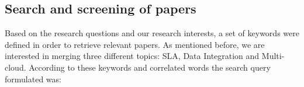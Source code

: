 \subsection{Search and screening of papers} \label{subsec:search}

Based on the research questions and our research interests, a set of keywords were defined in order to 
retrieve relevant papers.
As mentioned before, we are interested in merging three different topics: SLA, Data Integration and Multi-cloud.
According to these keywords and correlated words the search query formulated was:
\medskip  \\
